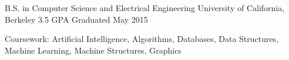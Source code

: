 \begin{cventries}
  \cventry
    {B.S. in Computer Science and Electrical Engineering}
    {University of California, Berkeley}
    {3.5 GPA}
    {Graduated May 2015}
    {
      \begin{cvitems}
        \item {Coursework: Artificial Intelligence, Algorithms, Databases, Data Structures, Machine Learning, Machine Structures, Graphics}
      \end{cvitems}
    }
\end{cventries}
